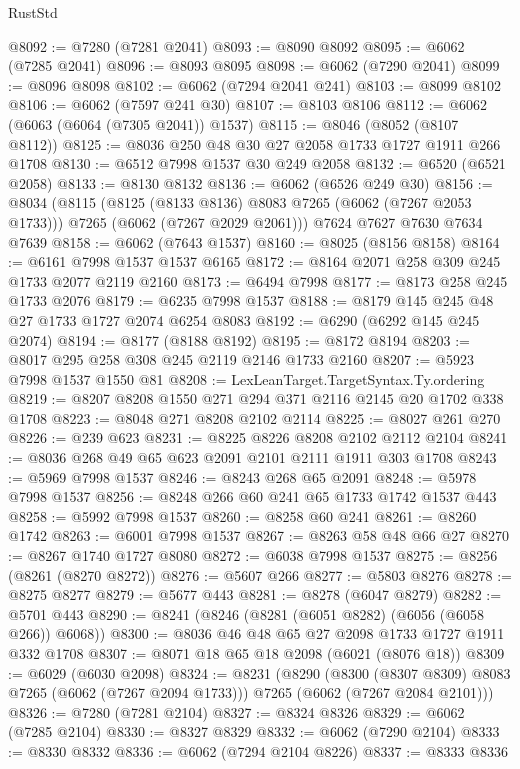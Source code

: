 \begin{lexlean}{RustStd}
\begin{coremodule}
@8092 := @7280 (@7281 @2041)
@8093 := @8090 @8092
@8095 := @6062 (@7285 @2041)
@8096 := @8093 @8095
@8098 := @6062 (@7290 @2041)
@8099 := @8096 @8098
@8102 := @6062 (@7294 @2041 @241)
@8103 := @8099 @8102
@8106 := @6062 (@7597 @241 @30)
@8107 := @8103 @8106
@8112 := @6062 (@6063 (@6064 (@7305 @2041)) @1537)
@8115 := @8046 (@8052 (@8107 @8112))
@8125 := @8036 @250 @48 @30 @27 @2058 @1733 @1727 @1911 @266 @1708
@8130 := @6512 @7998 @1537 @30 @249 @2058
@8132 := @6520 (@6521 @2058)
@8133 := @8130 @8132
@8136 := @6062 (@6526 @249 @30)
@8156 := @8034
    (@8115
      (@8125 (@8133 @8136) @8083 @7265 (@6062 (@7267 @2053 @1733)))
      @7265
      (@6062 (@7267 @2029 @2061)))
    @7624
    @7627
    @7630
    @7634
    @7639
@8158 := @6062 (@7643 @1537)
@8160 := @8025 (@8156 @8158)
@8164 := @6161 @7998 @1537 @1537 @6165
@8172 := @8164 @2071 @258 @309 @245 @1733 @2077 @2119 @2160
@8173 := @6494 @7998
@8177 := @8173 @258 @245 @1733 @2076
@8179 := @6235 @7998 @1537
@8188 := @8179 @145 @245 @48 @27 @1733 @1727 @2074 @6254 @8083
@8192 := @6290 (@6292 @145 @245 @2074)
@8194 := @8177 (@8188 @8192)
@8195 := @8172 @8194
@8203 := @8017 @295 @258 @308 @245 @2119 @2146 @1733 @2160
@8207 := @5923 @7998 @1537 @1550 @81
@8208 := LexLeanTarget.TargetSyntax.Ty.ordering
@8219 := @8207 @8208 @1550 @271 @294 @371 @2116 @2145 @20 @1702 @338 @1708
@8223 := @8048 @271 @8208 @2102 @2114
@8225 := @8027 @261 @270
@8226 := @239 @623
@8231 := @8225 @8226 @8208 @2102 @2112 @2104
@8241 := @8036 @268 @49 @65 @623 @2091 @2101 @2111 @1911 @303 @1708
@8243 := @5969 @7998 @1537
@8246 := @8243 @268 @65 @2091
@8248 := @5978 @7998 @1537
@8256 := @8248 @266 @60 @241 @65 @1733 @1742 @1537 @443
@8258 := @5992 @7998 @1537
@8260 := @8258 @60 @241
@8261 := @8260 @1742
@8263 := @6001 @7998 @1537
@8267 := @8263 @58 @48 @66 @27
@8270 := @8267 @1740 @1727 @8080
@8272 := @6038 @7998 @1537
@8275 := @8256 (@8261 (@8270 @8272))
@8276 := @5607 @266
@8277 := @5803 @8276
@8278 := @8275 @8277
@8279 := @5677 @443
@8281 := @8278 (@6047 @8279)
@8282 := @5701 @443
@8290 := @8241 (@8246 (@8281 (@6051 @8282) (@6056 (@6058 @266)) @6068))
@8300 := @8036 @46 @48 @65 @27 @2098 @1733 @1727 @1911 @332 @1708
@8307 := @8071 @18 @65 @18 @2098 (@6021 (@8076 @18))
@8309 := @6029 (@6030 @2098)
@8324 := @8231
    (@8290
      (@8300 (@8307 @8309) @8083 @7265 (@6062 (@7267 @2094 @1733)))
      @7265
      (@6062 (@7267 @2084 @2101)))
@8326 := @7280 (@7281 @2104)
@8327 := @8324 @8326
@8329 := @6062 (@7285 @2104)
@8330 := @8327 @8329
@8332 := @6062 (@7290 @2104)
@8333 := @8330 @8332
@8336 := @6062 (@7294 @2104 @8226)
@8337 := @8333 @8336

\end{coremodule}
\end{lexlean}
